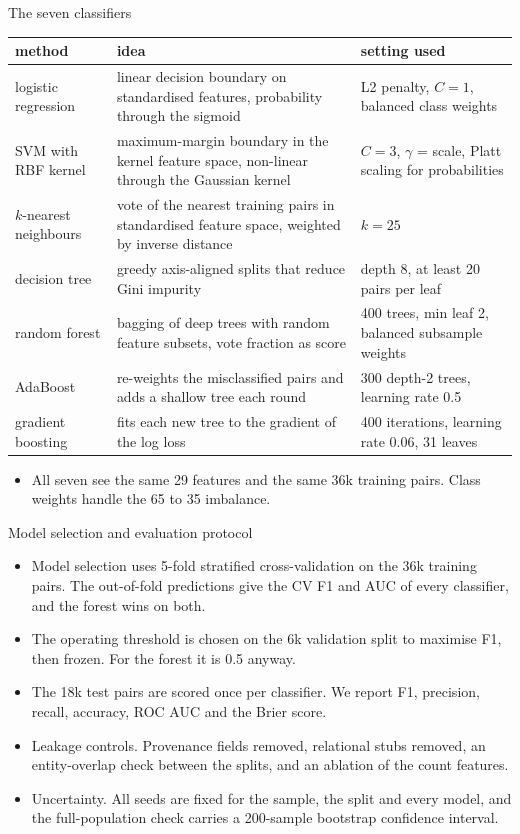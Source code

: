 \documentclass[aspectratio=169,10pt]{beamer}
\begin{document}
\begin{frame}{The seven classifiers}
\footnotesize
\begin{tabular}{@{}p{}p{}p{}@{}}
\toprule
method & idea & setting used\\
\midrule
logistic regression & linear decision boundary on standardised features, probability through the sigmoid & L2 penalty, $C=1$, balanced class weights\\
SVM with RBF kernel & maximum-margin boundary in the kernel feature space, non-linear through the Gaussian kernel & $C=3$, $\gamma$ = scale, Platt scaling for probabilities\\
$k$-nearest neighbours & vote of the nearest training pairs in standardised feature space, weighted by inverse distance & $k=25$\\
decision tree & greedy axis-aligned splits that reduce Gini impurity & depth 8, at least 20 pairs per leaf\\
random forest & bagging of deep trees with random feature subsets, vote fraction as score & 400 trees, min leaf 2, balanced subsample weights\\
AdaBoost & re-weights the misclassified pairs and adds a shallow tree each round & 300 depth-2 trees, learning rate 0.5\\
gradient boosting & fits each new tree to the gradient of the log loss & 400 iterations, learning rate 0.06, 31 leaves\\
\bottomrule
\end{tabular}
\vspace{2mm}
\begin{itemize}
\item All seven see the same 29 features and the same 36k training pairs. Class weights handle the 65 to 35 imbalance.
\end{itemize}
\end{frame}

\begin{frame}{Model selection and evaluation protocol}
\begin{itemize}
\item Model selection uses 5-fold stratified cross-validation on the 36k training pairs. The out-of-fold predictions give the CV F1 and AUC of every classifier, and the forest wins on both.
\item The operating threshold is chosen on the 6k validation split to maximise F1, then frozen. For the forest it is 0.5 anyway.
\item The 18k test pairs are scored once per classifier. We report F1, precision, recall, accuracy, ROC AUC and the Brier score.
\item Leakage controls. Provenance fields removed, relational stubs removed, an entity-overlap check between the splits, and an ablation of the count features.
\item Uncertainty. All seeds are fixed for the sample, the split and every model, and the full-population check carries a 200-sample bootstrap confidence interval.
\end{itemize}
\end{frame}
\end{document}
